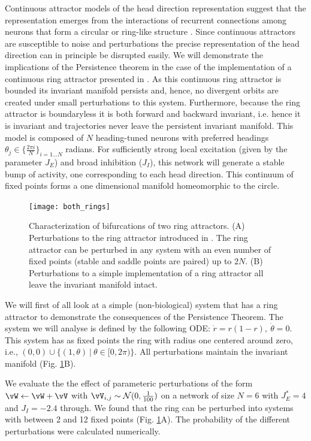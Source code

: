 \documentclass{article} %
\newcounter{ct}
\theoremstyle{definition}
\theoremstyle{remark}
\renewcommand{\cite}{\citep}
\begin{document}
Continuous attractor models of the head direction representation suggest that the representation emerges from the interactions of recurrent connections among neurons that form a circular or ring-like structure \citep{zhang1996, Noorman2022, ajabi2023}. 
Since continuous attractors are susceptible to noise and perturbations the precise representation of the head direction can in principle be disrupted easily.
We will demonstrate the implications of the Persistence theorem in the case of the implementation of a continuous ring attractor presented in \citep{Noorman2022}.
As this continuous ring attractor is bounded its invariant manifold persists and, hence, no divergent orbits are created under small perturbations to this system. 
Furthermore, because the ring attractor is boundaryless it is both forward and backward invariant, i.e. hence it is invariant and trajectories never leave the persistent invariant manifold\citep{wiggins1994}.
This model is composed of $N$ heading-tuned neurons  with preferred headings $\theta_j \in \{\frac{2\pi i}{N}\}_{i=1\dots N}$ radians.
For sufficiently strong local excitation (given by the parameter $J_E$) and broad inhibition ($J_I$), this network will generate a stable bump of activity, one corresponding to each head direction. This continuum of fixed points forms a one dimensional manifold homeomorphic to the circle. 

\begin{figure}[tbhp]
     \centering
  \texttt{[image: both\_rings]}
       \caption{Characterization of bifurcations of two ring attractors. 
       (A)       Perturbations to the ring attractor introduced in \cite{Noorman2022}. The ring attractor can be perturbed in any system with an even number of fixed points (stable and saddle points are paired) up to $2N$. 
       (B) Perturbations to a simple implementation of a ring attractor all leave the invariant manifold intact.
       }
         \label{fig:both_rings}
\end{figure}
We will first of all look at a simple (non-biological) system that has a ring attractor to demonstrate the consequences of the Persistence Theorem.
The system we will analyse is defined by the following ODE: $\dot r = r(1-r), \ \dot \theta = 0.$
This system has as fixed points the ring with radius one centered around zero, i.e., $(0,0)\cup\{(1,\theta)\ |\ \theta\in[0,2\pi)\}$. All perturbations maintain the invariant manifold (Fig. \ref{fig:both_rings}B).

We evaluate the  the effect of parameteric perturbations of the form $ \vW \leftarrow \vW + \vV$ with $\vV_{i,j}\sim\mathcal{N}(0,\frac{1}{100})$ on a network of size $N = 6$ with $J_E^*= 4$ and $J_I=-2.4$ through. 
We found that the ring can be perturbed into systems with between 2 and 12 fixed points (Fig. \ref{fig:both_rings}A).
The probability of the different perturbations were calculated numerically.
\end{document}
